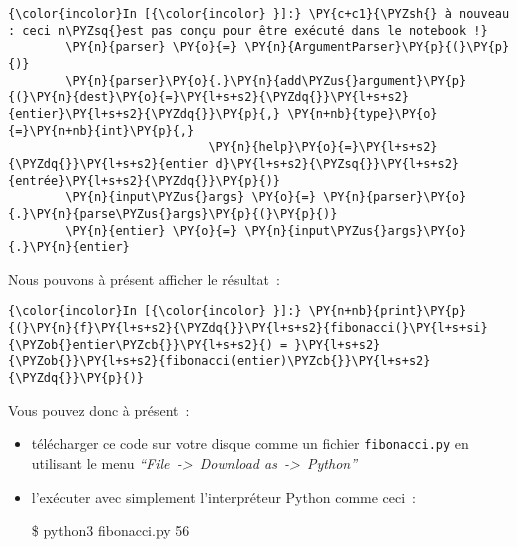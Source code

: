     \begin{Verbatim}[commandchars=\\\{\}]
{\color{incolor}In [{\color{incolor} }]:} \PY{c+c1}{\PYZsh{} à nouveau : ceci n\PYZsq{}est pas conçu pour être exécuté dans le notebook !}
        \PY{n}{parser} \PY{o}{=} \PY{n}{ArgumentParser}\PY{p}{(}\PY{p}{)}
        \PY{n}{parser}\PY{o}{.}\PY{n}{add\PYZus{}argument}\PY{p}{(}\PY{n}{dest}\PY{o}{=}\PY{l+s+s2}{\PYZdq{}}\PY{l+s+s2}{entier}\PY{l+s+s2}{\PYZdq{}}\PY{p}{,} \PY{n+nb}{type}\PY{o}{=}\PY{n+nb}{int}\PY{p}{,}
                            \PY{n}{help}\PY{o}{=}\PY{l+s+s2}{\PYZdq{}}\PY{l+s+s2}{entier d}\PY{l+s+s2}{\PYZsq{}}\PY{l+s+s2}{entrée}\PY{l+s+s2}{\PYZdq{}}\PY{p}{)}
        \PY{n}{input\PYZus{}args} \PY{o}{=} \PY{n}{parser}\PY{o}{.}\PY{n}{parse\PYZus{}args}\PY{p}{(}\PY{p}{)}
        \PY{n}{entier} \PY{o}{=} \PY{n}{input\PYZus{}args}\PY{o}{.}\PY{n}{entier}
\end{Verbatim}


    Nous pouvons à présent afficher le résultat~:

    \begin{Verbatim}[commandchars=\\\{\}]
{\color{incolor}In [{\color{incolor} }]:} \PY{n+nb}{print}\PY{p}{(}\PY{n}{f}\PY{l+s+s2}{\PYZdq{}}\PY{l+s+s2}{fibonacci(}\PY{l+s+si}{\PYZob{}entier\PYZcb{}}\PY{l+s+s2}{) = }\PY{l+s+s2}{\PYZob{}}\PY{l+s+s2}{fibonacci(entier)\PYZcb{}}\PY{l+s+s2}{\PYZdq{}}\PY{p}{)}
\end{Verbatim}


    Vous pouvez donc à présent~:

\begin{itemize}
\item
  télécharger ce code sur votre disque comme un fichier
  \texttt{fibonacci.py} en utilisant le menu
  \emph{``File~-\textgreater{}~Download as~-\textgreater{}~Python''}
\item
  l'exécuter avec simplement l'interpréteur Python comme ceci~:

  \$ python3 fibonacci.py 56
\end{itemize}